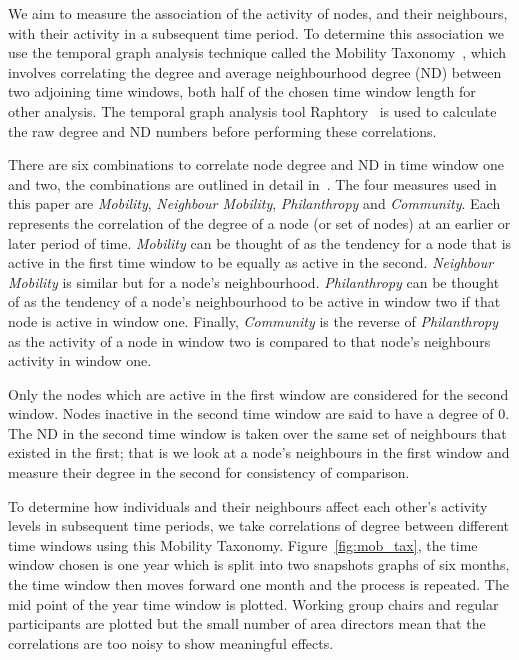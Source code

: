\documentclass[twocolumn,10pt]{article}
\newcommand{\pb}[1]{\vspace{0.75ex}\noindent{\textbf{#1}}}
\begin{document}
\pb{Mobility Taxonomy:}
We aim to measure the association of the activity of nodes, and their
neighbours, with their activity in a subsequent time period. To determine
this association we use the temporal graph analysis technique called the
Mobility Taxonomy~\cite{barnes2023measuring}, which involves correlating
the degree and average neighbourhood degree (ND) between two adjoining time
windows, both half of the chosen time window length for other analysis. The
temporal graph analysis tool Raphtory~\cite{steer2020raphtory} is used to
calculate the raw degree and ND numbers before performing these
correlations. 

There are six combinations to correlate node degree and ND in time window
one and two, the combinations are outlined in detail
in~\cite{barnes2023measuring}. The four measures used in this paper are
\textit{Mobility}, \textit{Neighbour Mobility}, \textit{Philanthropy} and
\textit{Community}.  Each represents the correlation of the degree of a
node (or set of nodes) at an earlier or later period of time.
\textit{Mobility} can be thought of as the tendency for a node that is
active in the first time window to be equally as active in the second.
\textit{Neighbour Mobility} is similar but for a node's neighbourhood.
\textit{Philanthropy} can be thought of as the tendency of a node's
neighbourhood to be active in window two if that node is active in window
one. Finally, \textit{Community} is the reverse of \textit{Philanthropy} as
the activity of a node in window two is compared to that node's neighbours
activity in window one.

Only the nodes which are active in the first window are considered for the
second window. Nodes inactive in the second time window are said to have a
degree of 0. The ND in the second time window is taken over the same set of
neighbours that existed in the first; that is we look at a node's
neighbours in the first window and measure their degree in the second for
consistency of comparison. 




\pb{Participant Mobility:}
To determine how individuals and their neighbours affect each other's
activity levels in subsequent time periods, we take correlations of degree
between different time windows using this Mobility Taxonomy. 
Figure~\ref{fig:mob_tax}, the time window chosen is one year which is split
into two snapshots graphs of six months, the time window then moves forward
one month and the process is repeated. The mid point of the year time
window is plotted. Working group chairs and regular participants are
plotted but the small number of area directors mean that the correlations
are too noisy to show meaningful effects. 
\end{document}
